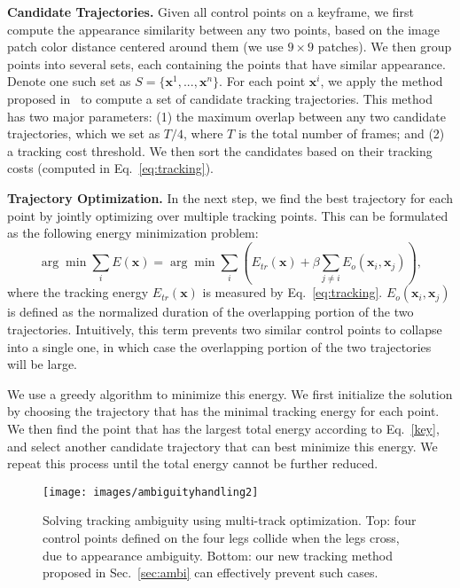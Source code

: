 {\bf Candidate Trajectories.}
Given all control points on a keyframe, we first compute the appearance similarity between any two points, based on the image patch color distance centered around them (we use $9\times 9$ patches). We then group points into several sets, each containing the points that have similar appearance. Denote one such set  as $S=\{\textbf{x}^1,...,\textbf{x}^n\}$. For each point $\textbf{x}^i$,
we apply the method proposed in~\cite{chondrogiannis2015alternative} to compute a set of candidate tracking trajectories. This method has two major parameters: (1) the maximum overlap between any two candidate trajectories, which we set as $T/4$, where $T$ is the total number of frames; and (2) a tracking cost threshold. We then sort the candidates based on their tracking costs (computed in Eq.~\ref{eq:tracking}).

{\bf Trajectory Optimization.}
In the next step, we find the best trajectory for each point by  jointly optimizing over multiple tracking points.
This can be formulated as the following energy minimization problem:
\begin{equation}\label{key}
\arg \min \sum_{i}E(\textbf{x})= \arg \min \sum_{i} (E_{tr}(\textbf{x}) + \beta \sum_{j \neq i} E_o(\textbf{x}_{i}, \textbf{x}_{j})),
\end{equation}
where the tracking energy $ E_{tr}(\textbf{x}) $ is measured by Eq.~\ref{eq:tracking}. $ E_o({\textbf{x}_{i}, \textbf{x}_{j}}) $ is defined as the normalized duration of the overlapping portion of the two trajectories. Intuitively, this term prevents two similar control points to collapse into a single one, in which case the overlapping portion of the two trajectories will be large. 

We use a greedy algorithm to minimize this energy. 
We first initialize the solution by choosing the trajectory that has the minimal tracking energy for each point. We then find the point that has the largest total energy according to Eq.~\ref{key}, and select another candidate trajectory that can best minimize this energy. We repeat this process until the total energy cannot be further reduced. 

\begin{figure}
	\centering
	\texttt{[image: images/ambiguityhandling2]}
	\caption{Solving tracking ambiguity using multi-track optimization. Top: four control points defined on the four legs collide when the legs cross, due to appearance ambiguity. Bottom: our new tracking method proposed in Sec.~\ref{sec:ambi} can effectively prevent such cases.}
	\label{fig:ambiguityhandling}
\end{figure}



